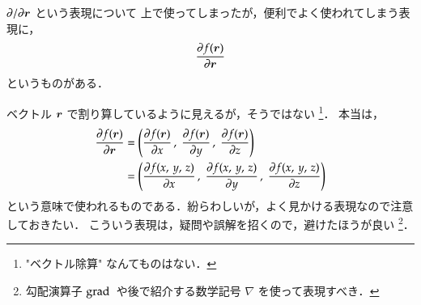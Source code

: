         \begin{memo}{$\partial / \partial \boldsymbol{r}$ という表現について}
            上で使ってしまったが，便利でよく使われてしまう表現に，
                        \begin{equation*}
                                \frac{\partial f(\boldsymbol{r})}{\partial \boldsymbol{r}}
                        \end{equation*}
            というものがある．

            ベクトル $\boldsymbol{r}$ で割り算しているように見えるが，そうではない
                \footnote{
                    "ベクトル除算" なんてものはない．
                }．
            本当は，
                        \begin{align*}
                                \frac{\partial f(\boldsymbol{r})}{\partial \boldsymbol{r}}
                                &=
                                    \left(
                                      \frac{\partial f(\boldsymbol{r})}{\partial x} \,,\;
                                      \frac{\partial f(\boldsymbol{r})}{\partial y} \,,\;
                                      \frac{\partial f(\boldsymbol{r})}{\partial z}
                                \right) \\
                                &=
                                    \left(
                                      \frac{\partial f(x,\,y,\,z)}{\partial x} \,,\;
                                      \frac{\partial f(x,\,y,\,z)}{\partial y} \,,\;
                                      \frac{\partial f(x,\,y,\,z)}{\partial z}
                                \right)
                                \end{align*}
                    という意味で使われるものである．紛らわしいが，よく見かける表現なので注意しておきたい．
                    こういう表現は，疑問や誤解を招くので，避けたほうが良い
                        \footnote{
                            勾配演算子 $\mathrm{grad}\,$ や後で紹介する数学記号 $\nabla$ を使って表現すべき．
                        }．
        \end{memo}

